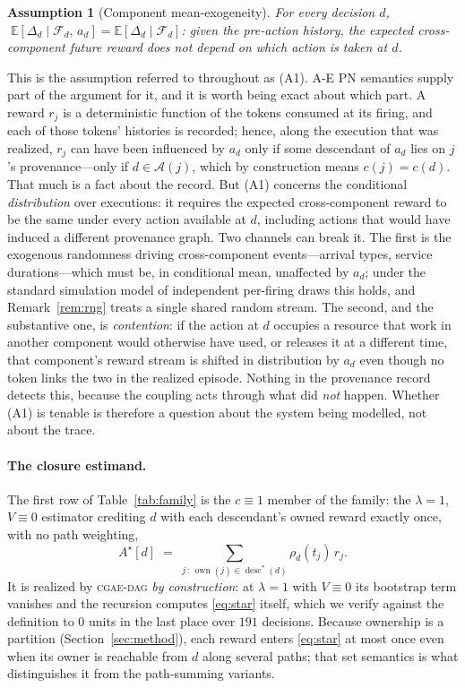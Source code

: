 \documentclass[review,authoryear,3p,times]{elsarticle}
\newtheorem{assumption}{Assumption}
\newcommand{\cdag}{\textsc{cgae-dag}}          %
\newcommand{\Fscr}{\mathcal{F}}
\newcommand{\Ascr}{\mathcal{A}}
\newcommand{\Ex}{\mathbb{E}}
\newcommand{\desc}{\operatorname{desc}}
\newcommand{\own}{\operatorname{own}}
\begin{document}
\begin{assumption}[Component mean-exogeneity]
\label{as:exo}
For every decision $d$,
$\;\Ex[\Delta_d \mid \Fscr_d,\,a_d] = \Ex[\Delta_d \mid \Fscr_d]$: given the
pre-action history, the \emph{expected} cross-component future reward does not
depend on which action is taken at $d$.
\end{assumption}

This is the assumption referred to throughout as (A1). A-E PN semantics supply
part of the argument for it, and it is worth being exact about which part. A
reward $r_j$ is a deterministic function of the tokens consumed at its firing,
and each of those tokens' histories is recorded; hence, along the execution that
was realized, $r_j$ can have been influenced by $a_d$ only if some descendant of
$a_d$ lies on $j$'s provenance---only if $d\in\Ascr(j)$, which by construction
means $c(j)=c(d)$. That much is a fact about the record. But (A1) concerns the
conditional \emph{distribution} over executions: it requires the expected
cross-component reward to be the same under every action available at $d$,
including actions that would have induced a different provenance graph. Two
channels can break it. The first is the exogenous randomness driving
cross-component events---arrival types, service durations---which must be, in
conditional mean, unaffected by $a_d$; under the standard simulation model of
independent per-firing draws this holds, and Remark~\ref{rem:rng} treats a
single shared random stream. The second, and the substantive one, is
\emph{contention}: if the action at $d$ occupies a resource that work in another
component would otherwise have used, or releases it at a different time, that
component's reward stream is shifted in distribution by $a_d$ even though no
token links the two in the realized episode. Nothing in the provenance record
detects this, because the coupling acts through what did \emph{not} happen.
Whether (A1) is tenable is therefore a question about the system being modelled,
not about the trace.

\paragraph{The closure estimand.} The first row of Table~\ref{tab:family} is the
$c\equiv1$ member of the family: the $\lambda=1$, $V\equiv0$ estimator crediting
$d$ with each descendant's owned reward exactly once, with no path weighting,
\begin{equation}
  A^{\star}[d] \;=\; \sum_{j\,:\,\own(j)\in\desc^{*}(d)} \rho_d(t_j)\,r_j .
  \label{eq:star}
\end{equation}
It is realized by \cdag{} \emph{by construction}: at $\lambda=1$ with
$V\equiv0$ its bootstrap term vanishes and the recursion computes
\eqref{eq:star} itself, which we verify against the definition to $0$ units in
the last place over $191$ decisions. Because ownership is a partition
(Section~\ref{sec:method}), each reward enters \eqref{eq:star} at most once even
when its owner is reachable from $d$ along several paths; that set semantics is
what distinguishes it from the path-summing variants.
\end{document}
